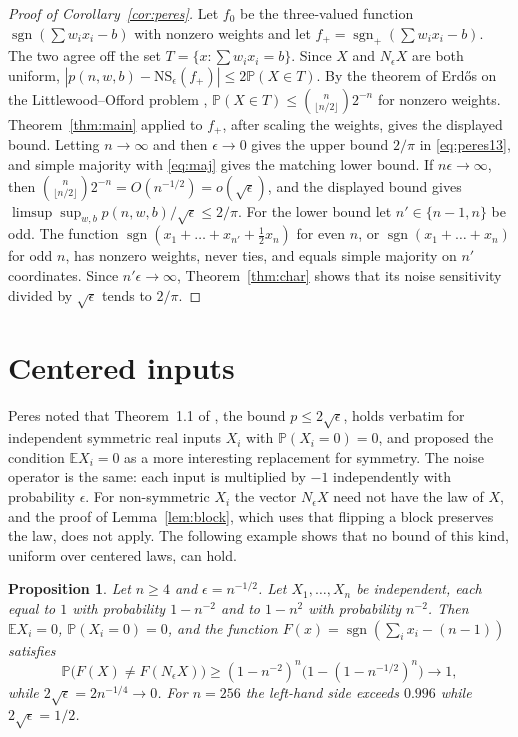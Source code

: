 \documentclass[11pt]{amsart}
\newtheorem{proposition}[theorem]{Proposition}
\theoremstyle{remark}
\numberwithin{equation}{section}
\newcommand{\PP}{\mathbb{P}}
\newcommand{\EE}{\mathbb{E}}
\newcommand{\sgnp}{\operatorname{sgn}_+}
\newcommand{\sgnz}{\operatorname{sgn}}
\begin{document}
\begin{proof}[Proof of Corollary~\ref{cor:peres}]
Let $f_0$ be the three-valued function $\sgnz(\sum w_ix_i-b)$ with nonzero weights and let $f_+=\sgnp(\sum w_ix_i-b)$. The two agree off the set $T=\{x:\sum w_ix_i=b\}$. Since $X$ and $N_\epsilon X$ are both uniform, $|p(n,w,b)-\mathrm{NS}_\epsilon(f_+)|\le2\PP(X\in T)$. By the theorem of Erd\H{o}s on the Littlewood--Offord problem \cite{Erd45}, $\PP(X\in T)\le\binom{n}{\lfloor n/2\rfloor}2^{-n}$ for nonzero weights. Theorem~\ref{thm:main} applied to $f_+$, after scaling the weights, gives the displayed bound. Letting $n\to\infty$ and then $\epsilon\to0$ gives the upper bound $2/\pi$ in \eqref{eq:peres13}, and simple majority with \eqref{eq:maj} gives the matching lower bound. If $n\epsilon\to\infty$, then $\binom{n}{\lfloor n/2\rfloor}2^{-n}=O(n^{-1/2})=o(\sqrt\epsilon)$, and the displayed bound gives $\limsup\sup_{w,b}p(n,w,b)/\sqrt\epsilon\le2/\pi$. For the lower bound let $n'\in\{n-1,n\}$ be odd. The function $\sgnz(x_1+\dots+x_{n'}+\frac12x_n)$ for even $n$, or $\sgnz(x_1+\dots+x_n)$ for odd $n$, has nonzero weights, never ties, and equals simple majority on $n'$ coordinates. Since $n'\epsilon\to\infty$, Theorem~\ref{thm:char} shows that its noise sensitivity divided by $\sqrt\epsilon$ tends to $2/\pi$.
\end{proof}

\section{Centered inputs}\label{sec:centered}

Peres noted that Theorem~1.1 of \cite{Per04}, the bound $p\le2\sqrt\epsilon$, holds verbatim for independent symmetric real inputs $X_i$ with $\PP(X_i=0)=0$, and proposed the condition $\EE X_i=0$ as a more interesting replacement for symmetry. The noise operator is the same: each input is multiplied by $-1$ independently with probability $\epsilon$. For non-symmetric $X_i$ the vector $N_\epsilon X$ need not have the law of $X$, and the proof of Lemma~\ref{lem:block}, which uses that flipping a block preserves the law, does not apply. The following example shows that no bound of this kind, uniform over centered laws, can hold.

\begin{proposition}\label{prop:centered}
Let $n\ge4$ and $\epsilon=n^{-1/2}$. Let $X_1,\dots,X_n$ be independent, each equal to $1$ with probability $1-n^{-2}$ and to $1-n^2$ with probability $n^{-2}$. Then $\EE X_i=0$, $\PP(X_i=0)=0$, and the function $F(x)=\sgnz(\sum_ix_i-(n-1))$ satisfies
\[
\PP\bigl(F(X)\ne F(N_\epsilon X)\bigr)\ge(1-n^{-2})^n\bigl(1-(1-n^{-1/2})^n\bigr)\to1,
\]
while $2\sqrt\epsilon=2n^{-1/4}\to0$. For $n=256$ the left-hand side exceeds $0.996$ while $2\sqrt\epsilon=1/2$.
\end{proposition}
\end{document}
